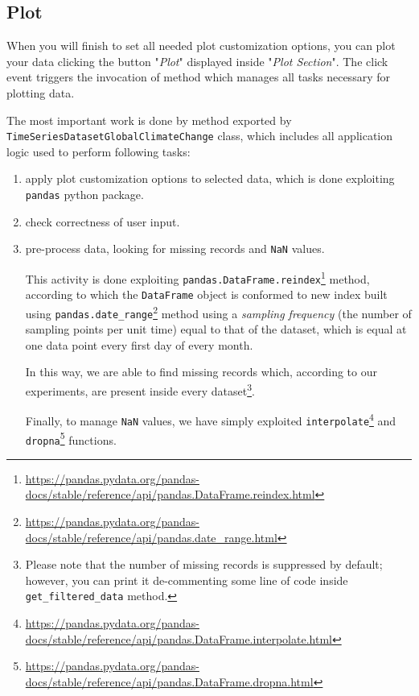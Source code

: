 \documentclass[sigconf]{acmart}
\begin{document}
\subsection{Plot}

When you will finish to set all needed plot customization options, you can plot your data clicking the button "\textit{Plot}" displayed inside "\textit{Plot Section}". The click event triggers the invocation of  method which manages all tasks necessary for plotting data. 

The most important work is done by  method exported by \texttt{TimeSeriesDatasetGlobalClimateChange} class, which includes all application logic used to perform following tasks:
\begin{enumerate}
\item apply plot customization options to selected data, which is done exploiting \texttt{pandas} python package.
\item check correctness of user input.
\item pre-process data, looking for missing records and \texttt{NaN} values. 

This activity is done exploiting \texttt{pandas.DataFrame.reindex}\footnote{\url{https://pandas.pydata.org/pandas-docs/stable/reference/api/pandas.DataFrame.reindex.html}} method, according to which the \texttt{DataFrame} object is conformed to new index built using \texttt{pandas.date\_range}\footnote{\url{https://pandas.pydata.org/pandas-docs/stable/reference/api/pandas.date\_range.html}} method using a \textit{sampling frequency} (the number of sampling points per unit time) equal to that of the dataset, which is equal at one data point every first day of every month. 

In this way, we are able to find missing records which, according to our experiments, are present inside every dataset\footnote{Please note that the number of missing records is suppressed by default; however, you can print it de-commenting some line of code inside \texttt{get\_filtered\_data} method.}.

Finally, to manage \texttt{NaN} values, we have simply exploited \texttt{interpolate}\footnote{\url{https://pandas.pydata.org/pandas-docs/stable/reference/api/pandas.DataFrame.interpolate.html}} and \texttt{dropna}\footnote{\url{https://pandas.pydata.org/pandas-docs/stable/reference/api/pandas.DataFrame.dropna.html}} functions.
\end{enumerate}
\end{document}
